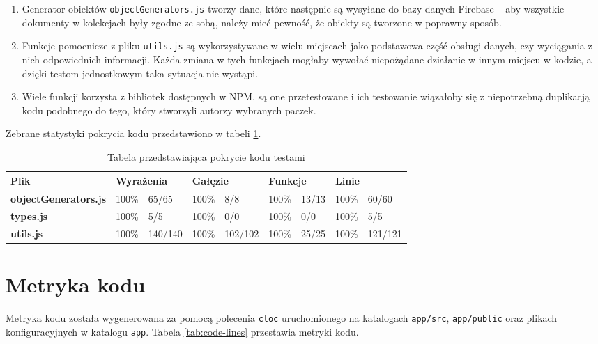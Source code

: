 \documentclass[shortabstract]{iithesis}
\theoremstyle{definition} \newtheorem{definition}{Definicja}[]
\theoremstyle{remark} \newtheorem{remark}[definition]{Observation}
\theoremstyle{plain} \newtheorem{theorem}[definition]{Theorem}
\theoremstyle{plain} \newtheorem{lemma}[definition]{Lemma}
\begin{document}
\begin{enumerate}
    \item Generator obiektów \texttt{objectGenerators.js} tworzy dane, które następnie są wysyłane do bazy danych Firebase -- aby wszystkie dokumenty w kolekcjach były zgodne ze sobą, należy mieć pewność, że obiekty są tworzone w poprawny sposób.
    \item Funkcje pomocnicze z pliku \texttt{utils.js} są wykorzystywane w wielu miejscach jako podstawowa część obsługi danych, czy wyciągania z nich odpowiednich informacji. Każda zmiana w tych funkcjach mogłaby wywołać niepożądane działanie w innym miejscu w kodzie, a dzięki testom jednostkowym taka sytuacja nie wystąpi.
    \item Wiele funkcji korzysta z bibliotek dostępnych w NPM, są one przetestowane i ich testowanie wiązałoby się z niepotrzebną duplikacją kodu podobnego do tego, który stworzyli autorzy wybranych paczek.
\end{enumerate}
Zebrane statystyki pokrycia kodu przedstawiono w tabeli \ref{tab:tests-coverage}.

\begin{table}[h]
    \begin{tabular}{|l|ll|ll|ll|ll|}
    \hline
    \textbf{Plik}                & \multicolumn{2}{l|}{\textbf{Wyrażenia}} & \multicolumn{2}{l|}{\textbf{Gałęzie}} & \multicolumn{2}{l|}{\textbf{Funkcje}} & \multicolumn{2}{l|}{\textbf{Linie}}  \\ \hline
    \textbf{objectGenerators.js} & \multicolumn{1}{l|}{100\%}   & 65/65    & \multicolumn{1}{l|}{100\%}  & 8/8     & \multicolumn{1}{l|}{100\%}   & 13/13  & \multicolumn{1}{l|}{100\%} & 60/60   \\ \hline
    \textbf{types.js}            & \multicolumn{1}{l|}{100\%}   & 5/5      & \multicolumn{1}{l|}{100\%}  & 0/0     & \multicolumn{1}{l|}{100\%}   & 0/0    & \multicolumn{1}{l|}{100\%} & 5/5     \\ \hline
    \textbf{utils.js}            & \multicolumn{1}{l|}{100\%}   & 140/140  & \multicolumn{1}{l|}{100\%}  & 102/102 & \multicolumn{1}{l|}{100\%}   & 25/25  & \multicolumn{1}{l|}{100\%} & 121/121 \\ \hline
    \end{tabular}
    \caption{\label{tab:tests-coverage}Tabela przedstawiająca pokrycie kodu testami}
\end{table}

\section{Metryka kodu}
Metryka kodu została wygenerowana za pomocą polecenia \texttt{cloc} uruchomionego na katalogach \texttt{app/src}, \texttt{app/public} oraz plikach konfiguracyjnych w katalogu \texttt{app}. Tabela \ref{tab:code-lines} przestawia metryki kodu.
\end{document}
